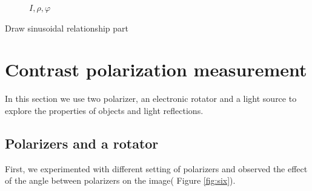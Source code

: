 \documentclass[english]{article}
\begin{document}
\begin{figure}[H]
	\centering
	\caption{$I, \rho, \varphi$}
	\label{fig:five}
\end{figure}

Draw sinusoidal relationship part

\section{Contrast polarization measurement}
In this section we use two polarizer, an electronic rotator and a light source to explore the properties of objects and light reflections.\\

\subsection{Polarizers and a rotator}
First, we experimented with different setting of polarizers and observed the effect of the angle between polarizers on the image( Figure \ref{fig:six}).\\
\end{document}
